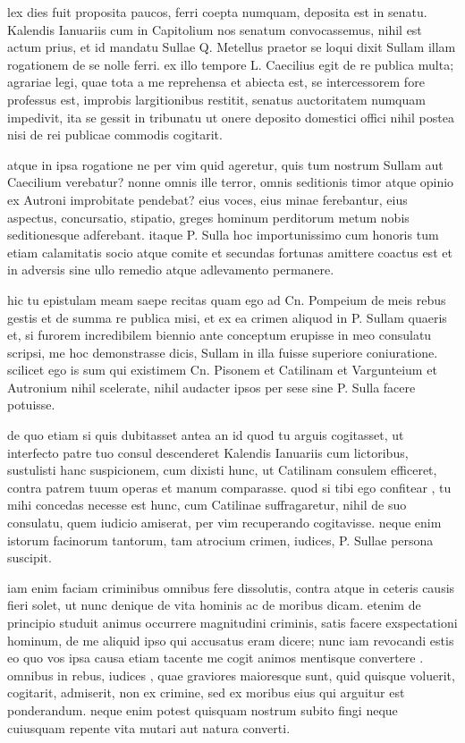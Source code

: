  lex dies fuit proposita paucos, ferri coepta numquam, deposita est in senatu. Kalendis Ianuariis cum in Capitolium nos senatum convocassemus, nihil est actum prius, et id mandatu Sullae Q. Metellus praetor se loqui dixit Sullam illam rogationem de se nolle ferri. ex illo tempore L. Caecilius egit de re publica multa; agrariae legi, quae tota a me reprehensa et abiecta est, se intercessorem fore professus est, improbis largitionibus restitit, senatus auctoritatem numquam impedivit, ita se gessit in tribunatu ut onere deposito domestici offici nihil postea nisi de rei publicae commodis cogitarit.

 atque in ipsa rogatione ne per vim quid ageretur, quis tum nostrum Sullam aut Caecilium verebatur? nonne omnis ille terror, omnis seditionis timor atque opinio ex Autroni improbitate pendebat? eius voces, eius minae ferebantur, eius aspectus, concursatio, stipatio, greges hominum perditorum metum nobis seditionesque adferebant. itaque P. Sulla hoc importunissimo cum honoris tum etiam calamitatis socio atque comite et secundas fortunas amittere coactus est et in adversis sine ullo remedio atque adlevamento permanere.

 hic tu epistulam meam saepe recitas quam ego ad Cn. Pompeium de meis rebus gestis et de summa re publica misi, et ex ea crimen aliquod in P. Sullam quaeris et, si furorem incredibilem biennio ante conceptum erupisse in meo consulatu scripsi, me hoc demonstrasse dicis, Sullam in illa fuisse superiore coniuratione. scilicet ego is sum qui existimem Cn. Pisonem et Catilinam et Vargunteium et Autronium nihil scelerate, nihil audacter ipsos per sese sine P. Sulla facere potuisse.

 de quo etiam si quis dubitasset antea an id quod tu arguis cogitasset, ut interfecto patre tuo consul descenderet Kalendis Ianuariis cum lictoribus, sustulisti hanc suspicionem, cum dixisti hunc, ut Catilinam consulem efficeret, contra patrem tuum operas et manum comparasse. quod si tibi ego confitear , tu mihi concedas necesse est hunc, cum Catilinae suffragaretur, nihil de suo consulatu, quem iudicio amiserat, per vim recuperando cogitavisse. neque enim istorum facinorum tantorum, tam atrocium crimen, iudices, P. Sullae persona suscipit.

 iam enim faciam criminibus omnibus fere dissolutis, contra atque in ceteris causis fieri solet, ut nunc denique de vita hominis ac de moribus dicam. etenim de principio studuit animus occurrere magnitudini criminis, satis facere exspectationi hominum, de me aliquid ipso qui accusatus eram dicere; nunc iam revocandi estis eo quo vos ipsa causa etiam tacente me cogit animos mentisque convertere . omnibus in rebus, iudices , quae graviores maioresque sunt, quid quisque voluerit, cogitarit, admiserit, non ex crimine, sed ex moribus eius qui arguitur est ponderandum. neque enim potest quisquam nostrum subito fingi neque cuiusquam repente vita mutari aut natura converti.

